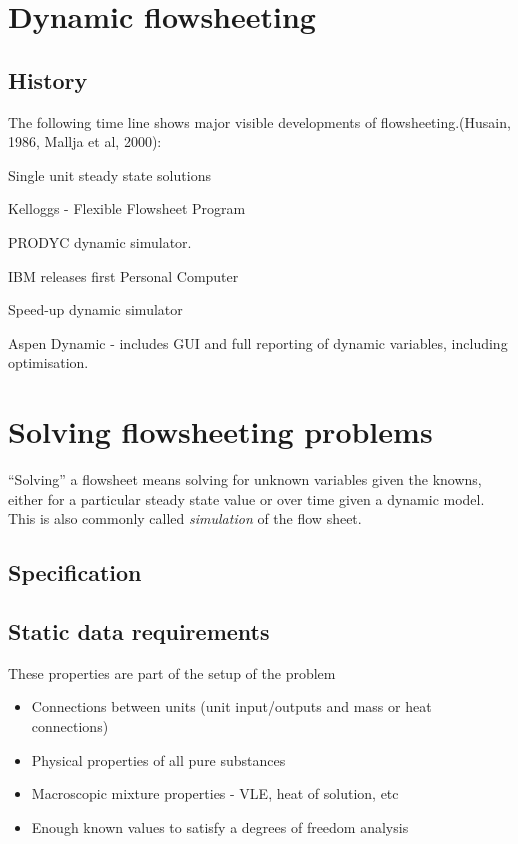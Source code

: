 \section{Dynamic flowsheeting}
\subsection{History}
The following time line shows major visible developments of
flowsheeting.(Husain, 1986, Mallja et al, 2000):
\begin{description}
\item 
\item[1955] Single unit steady state solutions 
\item[1958] Kelloggs - Flexible Flowsheet Program 
\item[1965] PRODYC dynamic simulator. 
\item[1970] IBM releases  first Personal Computer 
\item[1982] Speed-up dynamic simulator 
\item[1995] Aspen  Dynamic - includes GUI and full reporting of dynamic variables, including optimisation.
\end{description}

\section{Solving flowsheeting problems}
``Solving'' a flowsheet means solving for unknown variables given the
knowns, either for a particular steady state value or over time given
a dynamic model.  This is also commonly called \emph{simulation} of
the flow sheet.

\subsection{Specification}
\subsection{Static data requirements}
These properties are part of the setup of the problem
\begin{itemize}
\item Connections between units (unit input/outputs and mass or heat
  connections)
\item Physical properties of all pure substances
\item Macroscopic mixture properties - VLE, heat of solution, etc
\item Enough known values to satisfy a degrees of freedom analysis
\end{itemize}

